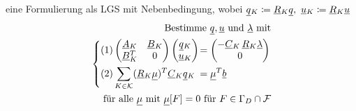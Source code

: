 eine Formulierung als LGS mit Nebenbedingung, wobei $ \ubar{q}_K \coloneqq \ubar{R}_K \ubar{q}, \ \ubar{u}_K \coloneqq \ubar{R}_K \ubar{u} $
\begin{align*}
\text{Bestimme } \underline{q}{}, \underline{u}{} \text{ und } \underline{\lambda}{} \text{ mit}\\
\begin{dcases}
(1) \begin{pmatrix}
\underline{A}{}_K & \underline{B}{}_K \\
\underline{B}{}_K^T & 0
\end{pmatrix}
\begin{pmatrix}
\underline{q}{}_K\\
\underline{u}{}_K
\end{pmatrix}
\mkern-16mu&= \begin{pmatrix}
- \underline{C}{}_K \, \underline{R}{}_K \underline{\lambda}{} \\
0
\end{pmatrix}\\
(2) \sum_{K \in \mathcal{K}}  (\underline{R}{}_K \underline{\mu}{})^T \underline{C}{}_K \underline{q}{}_K \mkern-16mu&= \underline{\mu}{}^T \underline{b}{}		
\end{dcases}\\
\text{für alle } \underline{\mu}{} \text{ mit } \underline{\mu}{}[F] = 0 \text{ für } F \in \Gamma_D \cap \mathcal{F}
\end{align*}

